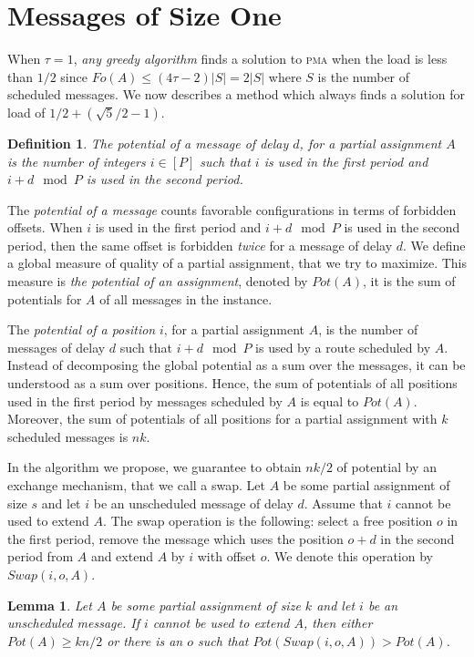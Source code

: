 \documentclass[10pt, conference, letterpaper]{algotel}
\newtheorem{lemma}[theorem]{Lemma}
\newtheorem{definition}{Definition}
\newcommand\pma{\textsc{pma}\xspace}
\begin{document}
 \section{Messages of Size One} \label{sec:small}

When $\tau = 1$, \emph{any greedy algorithm} finds a solution to \pma when the load is less than $1/2$ since $Fo(A) \leq (4\tau -2)|S| = 2|S|$ where $S$ is the number of scheduled messages. We now describes a method which always finds a solution for load of $1/2 + (\sqrt{5}/2 -1)$.
 
\begin{definition}
The potential of a message of delay $d$, for a partial assignment $A$
is the number of integers $i \in [P]$ such that $i$ is used in the first period and $i+d \mod P$ is used in the second period.
\end{definition}

The \emph{potential of a message} counts favorable configurations in terms of forbidden offsets.
When $i$ is used in the first period and $i+d \mod P$ is used in the second period,
then the same offset is forbidden \emph{twice} for a message of delay $d$. 
We define a global measure of quality of a partial assignment, 
that we try to maximize. This measure is \emph{the potential of an assignment}, denoted by $Pot(A)$, it is the sum of potentials for $A$ of all messages in the instance.

The \emph{potential of a position} $i$, for a partial assignment $A$, is the number of messages of delay $d$ such that $i+d \mod P$ is used by a route scheduled by $A$. 
Instead of decomposing the global potential as a sum over the messages, it can be understood
as a sum over positions. Hence, the sum of potentials of all positions used in the first period by messages scheduled by $A$ is equal to $Pot(A)$.  Moreover, the sum of potentials of all positions for a partial assignment with $k$ scheduled messages is $nk$.  

In the algorithm we propose, we guarantee to obtain $nk/2$ of potential by an exchange mechanism, that we call a swap. Let $A$ be some partial assignment of size $s$ and let $i$ be an unscheduled message of delay $d$. Assume that $i$ cannot be used to extend $A$. The swap operation is the following: select a free position $o$ in the first period, remove the message which uses the position $o+d$ in the second period from $A$ and extend $A$ by $i$ with offset $o$. We denote this operation by $Swap(i,o,A)$.

\begin{lemma}\label{lemma:swap}
Let $A$ be some partial assignment of size $k$ and let $i$ be an unscheduled message. If $i$ cannot be used to extend $A$, then either $Pot(A) \geq kn/2$ or there is an $o$ such that $Pot(Swap(i,o,A)) > Pot(A)$.
\end{lemma}
\end{document}
